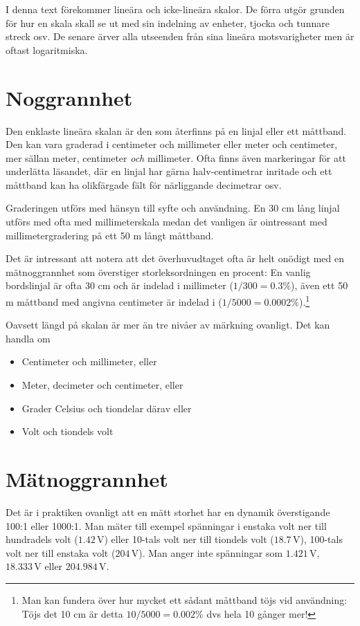 \documentclass[oneside,11pt,a4paper,swedish]{scrbook}
\begin{document}
I denna text förekommer lineära och icke-lineära skalor. De förra utgör grunden för hur en skala skall se ut med sin indelning av enheter, tjocka och tunnare streck osv. De senare ärver alla utseenden från sina lineära motsvarigheter men är oftast logaritmiska.

\section{Noggrannhet}

Den enklaste lineära skalan är den som återfinns på en linjal eller ett måttband. Den kan vara graderad i centimeter och millimeter eller meter och centimeter, mer sällan meter, centimeter \emph{och} millimeter. Ofta finns även markeringar för att underlätta läsandet, där en linjal har gärna halv-centimetrar inritade och  ett måttband kan ha olikfärgade fält för närliggande decimetrar osv.

Graderingen utförs med hänsyn till syfte och användning. En 30 cm lång linjal utförs med ofta med millimeterskala medan det vanligen är ointressant med millimetergradering på ett 50 m långt måttband. 

Det är intressant att notera att det överhuvudtaget ofta är helt onödigt med en mätnoggrannhet som överstiger storleksordningen en procent: En vanlig bordslinjal är ofta 30 cm och är indelad i millimeter ($1/300=0.3 \% $), även ett 50 m måttband med angivna centimeter är indelad i ($1/5000=0.0002 \% $).\footnote{Man kan fundera över hur mycket ett sådant måttband töjs vid användning: Töjs det 10 cm är detta $10/5000=0.002 \% $ dvs hela 10 gånger mer!}

Oavsett längd på skalan är mer än tre nivåer av märkning ovanligt. Det kan handla om

\begin{itemize}
\item Centimeter och  millimeter, eller
\item Meter, decimeter och centimeter, eller
\item Grader Celsius och tiondelar därav eller
\item Volt och  tiondels volt
\end{itemize}

\section{Mätnoggrannhet}

Det är i praktiken ovanligt att en mätt storhet har en dynamik överstigande 100:1 eller 1000:1. Man mäter till exempel spänningar i enstaka volt ner till hundradels volt ($1.42\,\textrm{V}$) eller 10-tals volt ner till tiondels volt ($18.7\,\textrm{V}$), 100-tals volt ner till enstaka volt ($204\,\textrm{V}$). Man anger inte spänningar som $1.421\,\textrm{V}$, $18.333\,\textrm{V}$ eller $204.984\,\textrm{V}$. 
\end{document}
